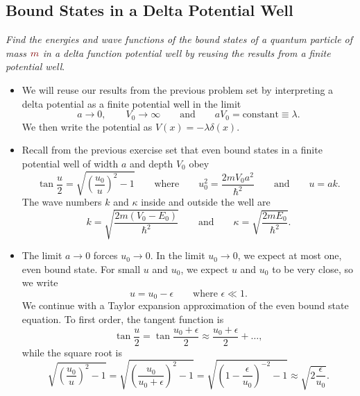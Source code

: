 \documentclass[11pt, a4paper]{article}
\newcommand{\dmath}[1]{\textcolor{Maroon}{#1}}  %
\newcommand{\eqtext}[1]{\qquad \text{#1} \qquad}
\begin{document}
\subsection{Bound States in a Delta Potential Well}
\textit{Find the energies and wave functions of the bound states of a quantum particle of mass $ \dmath{m} $ in a delta function potential well by reusing the results from a finite potential well}. 
\begin{itemize}
	\item We will reuse our results from the previous problem set by interpreting a delta potential as a finite potential well in the limit 
	\begin{equation*}
		a \to 0, \qquad V_{0} \to \infty \eqtext{and} aV_{0} = \text{constant} \equiv \lambda.
	\end{equation*}
    We then write the potential as $ V(x) = - \lambda \delta(x) $. 
	
	\item Recall from the previous exercise set that even bound states in a finite potential well of width $ a $ and depth $ V_{0} $ obey
	\begin{equation*}
		\tan \frac{u}{2} = \sqrt{\left(\frac{u_{0}}{u}\right)^{2} -1} \eqtext{where} u_{0}^{2} = \frac{2mV_{0}a^{2}}{\hbar^{2}} \eqtext{and} u = ak.
	\end{equation*}
	The wave numbers $ k $ and $ \kappa $ inside and outside the well are
	\begin{equation*}
		k = \sqrt{\frac{2m(V_{0}- E_{0})}{\hbar^{2}}} \eqtext{and} \kappa = \sqrt{\frac{2mE_{0}}{\hbar^{2}}}.
	\end{equation*}
	
	\item The limit $ a \to 0 $ forces $ u_{0} \to 0 $. In the limit $ u_{0} \to 0 $, we expect at most one, even bound state.	For small $ u $ and $ u_{0} $, we expect $ u $ and $ u_{0} $ to be very close, so we write
	\begin{equation*}
		u = u_{0} - \epsilon \qquad \text{where } \epsilon \ll 1.
	\end{equation*}
	We continue with a Taylor expansion approximation of the even bound state equation. To first order, the tangent function is
	\begin{equation*}
		\tan \frac{u}{2} = \tan \frac{u_{0} + \epsilon}{2} \approx \frac{u_{0} + \epsilon}{2} + \dots,
	\end{equation*}
	while the square root is
	\begin{equation*}
		\sqrt{\left(\frac{u_{0}}{u}\right)^{2} -1} = \sqrt{\left(\frac{u_{0}}{u_{0} + \epsilon}\right)^{2} -1} = \sqrt{\left(1 - \frac{\epsilon}{u_{0}}\right)^{-2} -1} \approx \sqrt{2\frac{\epsilon}{u_{0}}}.
	\end{equation*}
	

\end{itemize}
\end{document}
